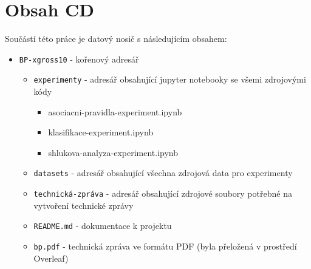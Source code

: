 \chapter{Obsah CD}
Součástí této práce je datový nosič s následujícím obsahem:

\begin{itemize}
    \item \verb|BP-xgross10| - kořenový adresář
    \begin{itemize}
        \item \verb|experimenty| - adresář obsahující jupyter notebooky se všemi zdrojovými kódy
        \begin{itemize}
            \item asociacni-pravidla-experiment.ipynb
            \item klasifikace-experiment.ipynb
            \item shlukova-analyza-experiment.ipynb
        \end{itemize}
        \item \verb|datasets| - adresář obsahující všechna zdrojová data pro experimenty
        \item \verb|technická-zpráva| - adresář obsahující zdrojové soubory potřebné na vytvoření technické zprávy
        \item \verb|README.md| - dokumentace k projektu
        \item \verb|bp.pdf| - technická zpráva ve formátu PDF (byla přeložená v prostředí Overleaf)
    \end{itemize}
\end{itemize}

\label{medium}
